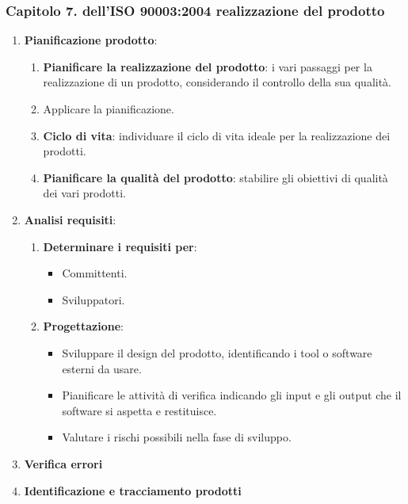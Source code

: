     \subsubsection{Capitolo 7. dell'ISO 90003:2004 realizzazione del prodotto}

    \begin{enumerate}
        \item \textbf{Pianificazione prodotto}:
            \begin{enumerate}
                \item \textbf{Pianificare la realizzazione del prodotto}: i vari passaggi per la realizzazione di un prodotto, considerando il controllo della sua qualità.
                \item Applicare la pianificazione.
                \item \textbf{Ciclo di vita}: individuare il ciclo di vita ideale per la realizzazione dei prodotti.
                \item \textbf{Pianificare la qualità del prodotto}: stabilire gli obiettivi di qualità dei vari prodotti.
            \end{enumerate}
        \item \textbf{Analisi requisiti}:
            \begin{enumerate}
                \item \textbf{Determinare i requisiti per}:
                    \begin{itemize}
                        \item Committenti.
                        \item Sviluppatori.
                    \end{itemize}
                \item \textbf{Progettazione}:
                    \begin{itemize}
                        \item Sviluppare il design del prodotto, identificando i tool o software esterni da usare.
                        \item Pianificare le attività di verifica indicando gli input e gli output che il software si aspetta e restituisce.
                        \item Valutare i rischi possibili nella fase di sviluppo.
                    \end{itemize}
            \end{enumerate}
        \item \textbf{Verifica errori}
        \item \textbf{Identificazione e tracciamento prodotti}
    \end{enumerate}
